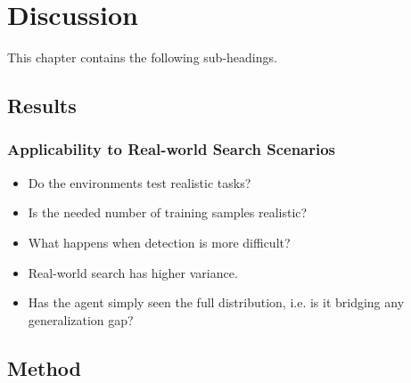 \chapter{Discussion}
\label{cha:discussion}

This chapter contains the following sub-headings.

\section{Results}
\label{sec:discussion-results}


\subsection{Applicability to Real-world Search Scenarios}

\begin{itemize}
    \item Do the environments test realistic tasks?
    \item Is the needed number of training samples realistic?
    \item What happens when detection is more difficult?
    \item Real-world search has higher variance.
    \item Has the agent simply seen the full distribution, i.e. is it bridging any generalization gap?
\end{itemize}

\section{Method}
\label{sec:discussion-method}

